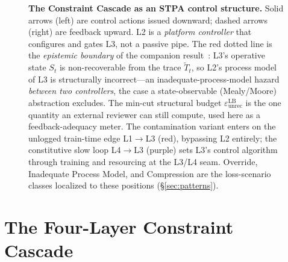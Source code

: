 \documentclass[11pt]{article}
\begin{document}
\begin{figure}[t]
{%
}
\caption{\textbf{The Constraint Cascade as an STPA control structure.} Solid arrows (left) are control actions issued downward; dashed arrows (right) are feedback upward. L2 is a \emph{platform controller} that configures and gates L3, not a passive pipe. The red dotted line is the \emph{epistemic boundary} of the companion result~\cite{anon2026dual}: L3's operative state $S_t$ is non-recoverable from the trace $\tilde T_t$, so L2's process model of L3 is structurally incorrect---an inadequate-process-model hazard \emph{between two controllers}, the case a state-observable (Mealy/Moore) abstraction excludes. The min-cut structural budget $\varepsilon_{\mathrm{unrec}}^{\mathrm{LB}}$ is the one quantity an external reviewer can still compute, used here as a feedback-adequacy meter. The contamination variant enters on the unlogged train-time edge L1$\to$L3 (red), bypassing L2 entirely; the constitutive slow loop L4$\to$L3 (purple) sets L3's control algorithm through training and resourcing at the L3/L4 seam. Override, Inadequate Process Model, and Compression are the loss-scenario classes localized to these positions (\S\ref{sec:patterns}).}
\label{fig:cascade}
\end{figure}

\section{The Four-Layer Constraint Cascade}\label{sec:cascade}
\end{document}
